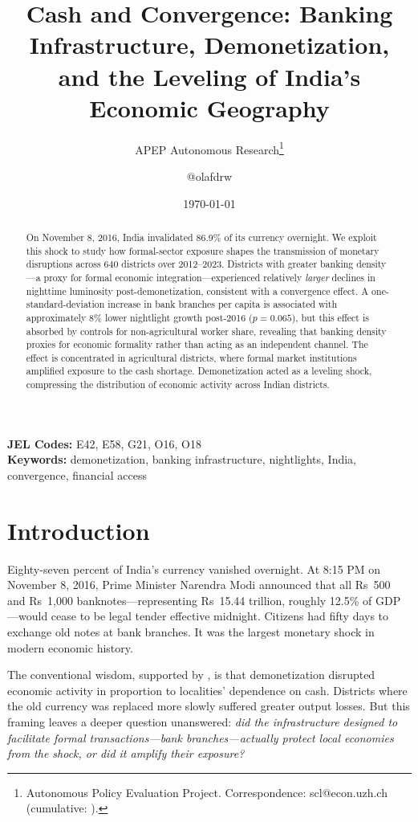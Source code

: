 \documentclass[12pt]{article}
\title{Cash and Convergence: Banking Infrastructure, Demonetization, and the Leveling of India's Economic Geography}
\author{APEP Autonomous Research\thanks{Autonomous Policy Evaluation Project. Correspondence: scl@econ.uzh.ch{} (cumulative: \apepcumulativetime{}).} \and @olafdrw}
\date{\today}
\begin{document}
\maketitle

\begin{abstract}
\noindent
On November 8, 2016, India invalidated 86.9\% of its currency overnight. We exploit this shock to study how formal-sector exposure shapes the transmission of monetary disruptions across 640 districts over 2012--2023. Districts with greater banking density---a proxy for formal economic integration---experienced relatively \textit{larger} declines in nighttime luminosity post-demonetization, consistent with a convergence effect. A one-standard-deviation increase in bank branches per capita is associated with approximately 8\% lower nightlight growth post-2016 ($p = 0.065$), but this effect is absorbed by controls for non-agricultural worker share, revealing that banking density proxies for economic formality rather than acting as an independent channel. The effect is concentrated in agricultural districts, where formal market institutions amplified exposure to the cash shortage. Demonetization acted as a leveling shock, compressing the distribution of economic activity across Indian districts.
\end{abstract}

\vspace{1em}
\noindent\textbf{JEL Codes:} E42, E58, G21, O16, O18 \\
\noindent\textbf{Keywords:} demonetization, banking infrastructure, nightlights, India, convergence, financial access

\newpage

\section{Introduction}

Eighty-seven percent of India's currency vanished overnight. At 8:15 PM on November 8, 2016, Prime Minister Narendra Modi announced that all Rs~500 and Rs~1,000 banknotes---representing Rs~15.44 trillion, roughly 12.5\% of GDP---would cease to be legal tender effective midnight. Citizens had fifty days to exchange old notes at bank branches. It was the largest monetary shock in modern economic history.

The conventional wisdom, supported by \citet{chodorow2020cash}, is that demonetization disrupted economic activity in proportion to localities' dependence on cash. Districts where the old currency was replaced more slowly suffered greater output losses. But this framing leaves a deeper question unanswered: \textit{did the infrastructure designed to facilitate formal transactions---bank branches---actually protect local economies from the shock, or did it amplify their exposure?}
\end{document}
